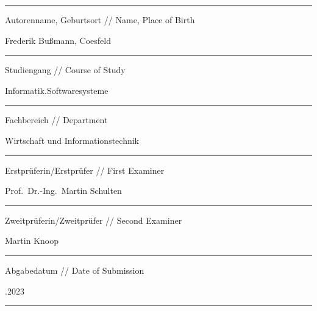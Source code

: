 \begin{titlepage}
        \noindent\rule{14.4cm}{0.4pt}

        \vskip 0.05cm

        \begingroup
        \fontsize{8pt}{6pt}\selectfont
        Autorenname, Geburtsort // Name, Place of Birth
        \endgroup

        \vskip -0.05cm

        \begingroup
        \fontsize{12pt}{14pt}\selectfont
        Frederik Bußmann, Coesfeld
        \endgroup
        \vskip -0.1cm

        \noindent\rule{14.4cm}{0.4pt}

        \vskip 0.05cm

        \begingroup
        \fontsize{8pt}{6pt}\selectfont
        Studiengang // Course of Study
        \endgroup

        \vskip -0.05cm

        \begingroup
        \fontsize{12pt}{14pt}\selectfont
        Informatik.Softwaresysteme
        \endgroup
        \vskip -0.1cm

        \noindent\rule{14.4cm}{0.4pt}

        \vskip 0.05cm

        \begingroup
        \fontsize{8pt}{6pt}\selectfont
        Fachbereich // Department
        \endgroup

        \vskip -0.05cm

        \begingroup
        \fontsize{12pt}{14pt}\selectfont
        Wirtschaft und Informationstechnik
        \endgroup
        \vskip -0.1cm

        \noindent\rule{14.4cm}{0.4pt}

        \vskip 0.05cm

        \begingroup
        \fontsize{8pt}{6pt}\selectfont
        Erstprüferin/Erstprüfer // First Examiner
        \endgroup

        \vskip -0.05cm

        \begingroup
        \fontsize{12pt}{14pt}\selectfont
        Prof.\ Dr.-Ing.\ Martin Schulten
        \endgroup
        \vskip -0.1cm

        \noindent\rule{14.4cm}{0.4pt}

        \vskip 0.05cm

        \begingroup
        \fontsize{8pt}{6pt}\selectfont
        Zweitprüferin/Zweitprüfer // Second Examiner
        \endgroup

        \vskip -0.05cm

        \begingroup
        \fontsize{12pt}{14pt}\selectfont
        Martin Knoop
        \endgroup
        \vskip -0.1cm

        \noindent\rule{14.4cm}{0.4pt}

        \vskip 0.05cm

        \begingroup
        \fontsize{8pt}{6pt}\selectfont
        Abgabedatum // Date of Submission
        \endgroup

        \vskip -0.05cm

        \begingroup
        \fontsize{12pt}{14pt}.2023
        \endgroup
        \vskip -0.1cm

        \noindent\rule{14.4cm}{0.4pt}
    \restoregeometry
\end{titlepage}
\clearpage
